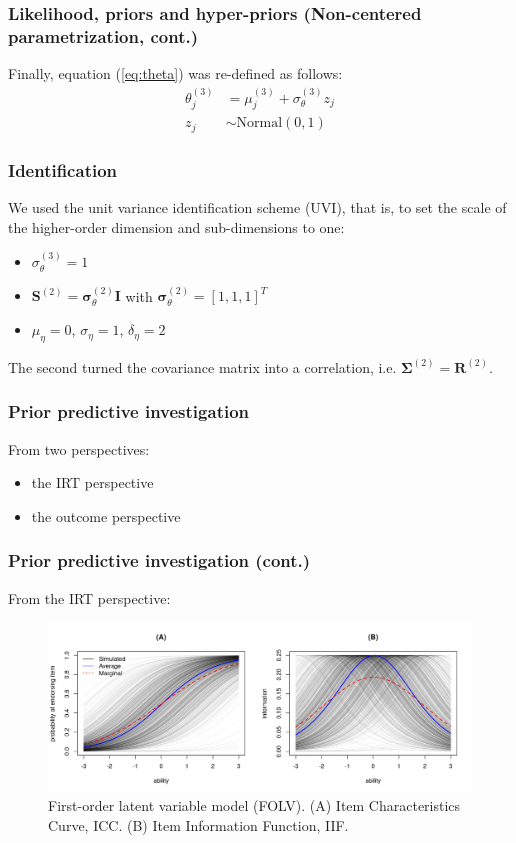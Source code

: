 \documentclass[arial,12pt,xcolor=dvipsnames]{beamer}
\begin{document}
%
\begin{frame}
	\frametitle{Likelihood, priors and hyper-priors
		(Non-centered parametrization, cont.)}
	Finally, equation (\ref{eq:theta}) was re-defined as follows:
	\begin{align}
		\theta^{(3)}_{j} &= \mu^{(3)}_{j} + \sigma^{(3)}_{\theta} z_{j} \\
		z_{j} &\sim \text{Normal}(0,1)
	\end{align}
\end{frame}
%
\begin{frame}
	\frametitle{Identification}
	We used the unit variance identification scheme (UVI), that is, to set the scale of the higher-order dimension and sub-dimensions to one:
	\begin{itemize}
		\item $\sigma^{(3)}_{\theta} = 1$
		\item $\mathbf{S}^{(2)} = \pmb{\sigma}^{(2)}_{\theta} \mathbf{I}$ with $\pmb{\sigma}^{(2)}_{\theta} = [1, 1, 1]^{T}$
		\item $\mu_{\eta} = 0$, $\sigma_{\eta}=1$, $\delta_{\eta}=2$
	\end{itemize}
	The second turned the covariance matrix into a correlation, i.e. $\boldsymbol{\Sigma}^{(2)} = \boldsymbol{R}^{(2)}$.
\end{frame}
%
\begin{frame}
	\frametitle{Prior predictive investigation}
	From two perspectives:
	\begin{itemize}
		\item the IRT perspective
		\item the outcome perspective
	\end{itemize}
\end{frame}
%
\begin{frame}
	\frametitle{Prior predictive investigation (cont.)}
	From the IRT perspective:
	\begin{figure}[H]
		\centering
		\includegraphics[width=1\linewidth]{FOLV_ICC_prior}
		\caption{First-order latent variable model (FOLV). (A) Item Characteristics Curve, ICC. (B) Item Information Function, IIF.}
		\label{fig:FOLV_ICC_prior}
	\end{figure} 
\end{frame}
\end{document}
